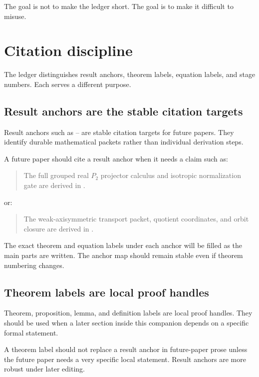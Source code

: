 The goal is not to make the ledger short.  The goal is to make it difficult to misuse.

\section{Citation discipline}
\label{sec:citation-discipline}

The ledger distinguishes result anchors, theorem labels, equation labels, and stage numbers.  Each serves a different purpose.

\subsection{Result anchors are the stable citation targets}
\label{subsec:result-anchors}

Result anchors such as -- are stable citation targets for future papers.  They identify durable mathematical packets rather than individual derivation steps.

A future paper should cite a result anchor when it needs a claim such as:
\begin{quote}
The full grouped real \(P_2\) projector calculus and isotropic normalization gate are derived in .
\end{quote}

or:
\begin{quote}
The weak-axisymmetric transport packet, quotient coordinates, and orbit closure are derived in .
\end{quote}

The exact theorem and equation labels under each anchor will be filled as the main parts are written.  The anchor map should remain stable even if theorem numbering changes.

\subsection{Theorem labels are local proof handles}
\label{subsec:theorem-labels}

Theorem, proposition, lemma, and definition labels are local proof handles.  They should be used when a later section inside this companion depends on a specific formal statement.

A theorem label should not replace a result anchor in future-paper prose unless the future paper needs a very specific local statement.  Result anchors are more robust under later editing.

